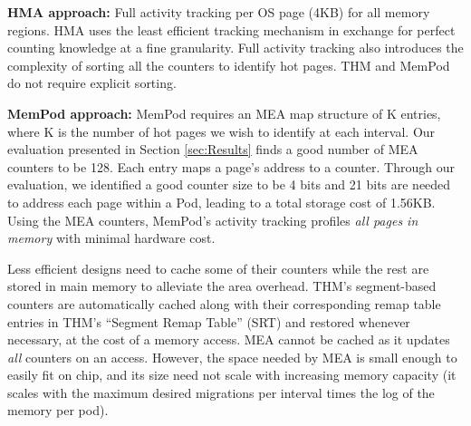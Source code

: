 	\textbf{HMA approach:} Full activity tracking per OS page (4KB) for all memory regions. HMA uses the least efficient tracking mechanism in exchange for perfect counting knowledge at a fine granularity. Full activity tracking also introduces the complexity of sorting all the counters to identify hot pages. THM and MemPod do not require explicit sorting.
	
	\textbf{MemPod approach:} MemPod requires an MEA map structure of K entries, where K is the number of hot pages we wish to identify at each interval. Our evaluation presented in Section \ref{sec:Results} finds a good number of MEA counters to be 128. Each entry maps a page's address to a counter. Through our evaluation, we identified a good counter size to be 4 bits and 21 bits are needed to address each page within a Pod, leading to a total storage cost of 1.56KB. Using the MEA counters, MemPod's activity tracking profiles \textit{all pages in memory} with minimal hardware cost. 

	

Less efficient designs need to cache some of their counters while the rest are stored in main memory to alleviate the area overhead. THM's segment-based 
counters are automatically cached along with their corresponding remap table entries in THM's ``Segment Remap Table'' (SRT) and restored whenever necessary, at the cost of a memory access. 
MEA cannot be cached as it updates \textit{all} counters on an access. 
However, the space needed by MEA is small enough to easily fit on chip,
and its size need not scale with increasing memory capacity (it scales with
the maximum desired migrations per interval times the log of the
memory per pod).


